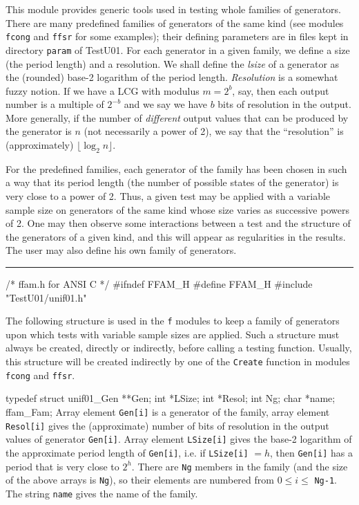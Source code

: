 
This module provides generic tools used in testing whole families of
generators. There are many predefined families of generators of the same
kind (see modules {\tt fcong} and {\tt ffsr} for some examples);
 their defining parameters are in files kept in directory {\tt param}
of TestU01. For each generator in a given family, we define a
size (the period length) and a resolution. We shall define
the {\it lsize} of a generator as the (rounded) base-2 logarithm of the
period length. \emph{Resolution} is a somewhat fuzzy notion.
If we have a LCG with modulus $m = 2^b$, say, then each output number
is a multiple of $2^{-b}$ and we say we have $b$ bits of resolution
in the output.
More generally, if the number of \emph{different} output values
that can be produced
by the generator is $n$ (not necessarily a power of 2), we say that
the ``resolution'' is (approximately) $\lfloor\log_2 n\rfloor$.


For the predefined families, each generator of the family has been chosen
in such a way that its period length (the number of possible states of the
generator) is very close to a power of 2. Thus, a given test may be applied
with a variable sample size on generators of the same kind whose size
varies as successive powers of 2. One may then observe some interactions
between a test and the structure of the generators of a given kind, and this
will appear as regularities in the results.
The user may also define his own family of generators.

\bigskip
\hrule
\code\hide
/* ffam.h  for ANSI C */
#ifndef FFAM_H
#define FFAM_H
\endhide
#include "TestU01/unif01.h"
\endcode



The following structure is used in the {\tt f} modules
to keep a family of generators upon which tests with variable sample
sizes are applied. Such a structure must always be created, directly or
indirectly, before calling a testing function. Usually, this structure will
be created indirectly by one of the {\tt Create} function in modules
{\tt fcong} and {\tt ffsr}.

\code


typedef struct {
   unif01_Gen **Gen;
   int *LSize;
   int *Resol;
   int Ng;
   char *name;
} ffam_Fam;
\endcode
\tab  Array element {\tt Gen[i]} is a generator of
  the family, array element {\tt Resol[i]} gives the (approximate) number
  of bits of resolution in the output values of generator {\tt Gen[i]}.
  Array element {\tt LSize[i]} gives the base-2 logarithm of the approximate
  period length of {\tt Gen[i]}, i.e. if {\tt LSize[i]} $= h$, then
  {\tt Gen[i]} has a period that is very close to $2^h$. There are {\tt Ng}
  members in the family (and the size of the above arrays is
  {\tt Ng}), so their elements are numbered from $0 \le i \le$ {\tt Ng-1}.
  The string {\tt name} gives the name of the family.
\endtab
\code


